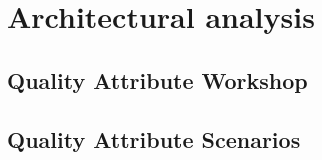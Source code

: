 \documentclass[10pt]{article}
\begin{document}
\section{Architectural analysis}


\subsection{Quality Attribute Workshop}

\subsection{Quality Attribute Scenarios}
\end{document}
